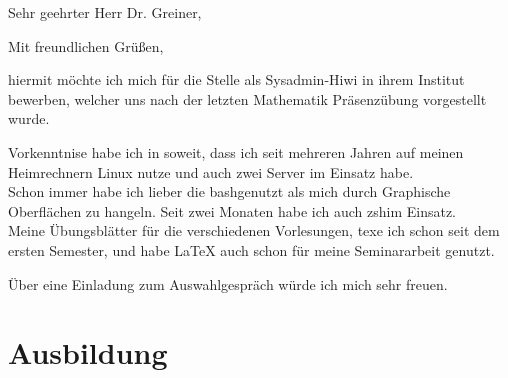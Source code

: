 \documentclass[11pt,a4paper,sans]{moderncv}        %
\begin{document}


\date{\today}
\opening{Sehr geehrter Herr Dr. Greiner,}
\closing{Mit freundlichen Grüßen, %
}
\makelettertitle


hiermit möchte ich mich für die Stelle als Sysadmin-Hiwi in ihrem Institut bewerben, welcher uns nach der letzten Mathematik Präsenzübung vorgestellt wurde.

Vorkenntnise habe ich in soweit, dass ich seit mehreren Jahren auf meinen Heimrechnern Linux nutze und auch zwei Server im Einsatz habe.\\
Schon immer habe ich lieber die \glqq bash\grqq genutzt als mich durch Graphische Oberflächen zu hangeln. Seit zwei Monaten habe ich auch \glqq zsh\grqq im Einsatz.\\
Meine Übungsblätter für die verschiedenen Vorlesungen, texe ich schon seit dem ersten Semester, und habe \LaTeX{} auch schon für meine Seminararbeit genutzt.

Über eine Einladung zum Auswahlgespräch würde ich mich sehr freuen.\\


\bigskip


\makeletterclosing

\newpage


\makecvtitle

\section{Ausbildung}
\end{document}
